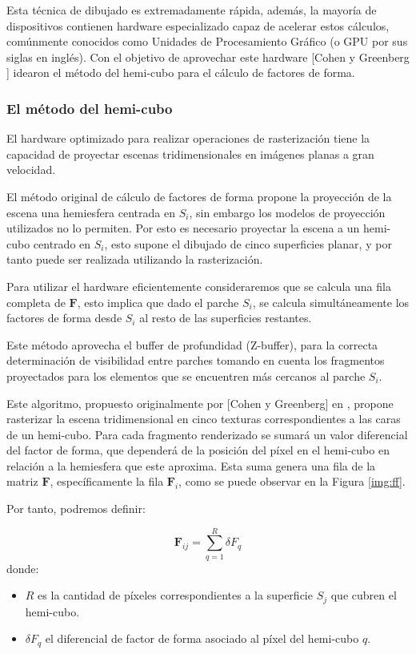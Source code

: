 Esta técnica de dibujado es extremadamente rápida, además, la mayoría de dispositivos contienen hardware especializado capaz de acelerar estos cálculos, comúnmente conocidos como Unidades de Procesamiento Gráfico (o GPU por sus siglas en inglés). Con el objetivo de aprovechar este hardware [Cohen y Greenberg \cite{Cohen}] idearon el método del hemi-cubo para el cálculo de factores de forma.

\subsubsection{El método del hemi-cubo}

El hardware optimizado para realizar operaciones de rasterización tiene la capacidad de proyectar escenas tridimensionales en imágenes planas a gran velocidad. 

El método original de cálculo de factores de forma propone la proyección de la escena una hemiesfera centrada en $S_{i}$, sin embargo los modelos de proyección utilizados no lo permiten. Por esto es necesario proyectar la escena a un hemi-cubo centrado en $S_{i}$, esto supone el dibujado de cinco superficies planar, y por tanto puede ser realizada utilizando la rasterización.

Para utilizar el hardware eficientemente consideraremos que se calcula una fila completa de $\mathbf{F}$, esto implica que dado el parche $S_{i}$, se calcula simultáneamente los factores de forma desde $S_{i}$ al resto de las superficies restantes. 

Este método aprovecha el buffer de profundidad (Z-buffer), para la correcta determinación de visibilidad entre parches tomando en cuenta los fragmentos proyectados para los elementos que se encuentren más cercanos al parche $S_{i}$.

Este algoritmo, propuesto originalmente por [Cohen y Greenberg] en \citeyear{Cohen}, propone rasterizar la escena tridimensional en cinco texturas correspondientes a las caras de un hemi-cubo. Para cada fragmento renderizado se sumará un valor diferencial del factor de forma, que dependerá de la posición del píxel en el hemi-cubo en relación a la hemiesfera que este aproxima.  Esta suma genera una fila de la matriz $\mathbf{F}$, específicamente la fila $\mathbf{F}_{i}$, como se puede observar en la Figura \ref{img:ff}.

Por tanto, podremos definir:

\begin{equation}
	\mathbf{F}_{ij} = \sum_{q=1}^{R} \delta{F_{q}}
	\label{eq:ffgreenberg}
\end{equation}
donde:
\begin{itemize}
	\item $R$ es la cantidad de píxeles correspondientes a la superficie $S_{j}$ que cubren el hemi-cubo.
	\item $\delta{F_{q}}$ el diferencial de factor de forma asociado al píxel del hemi-cubo $q$.
\end{itemize}

